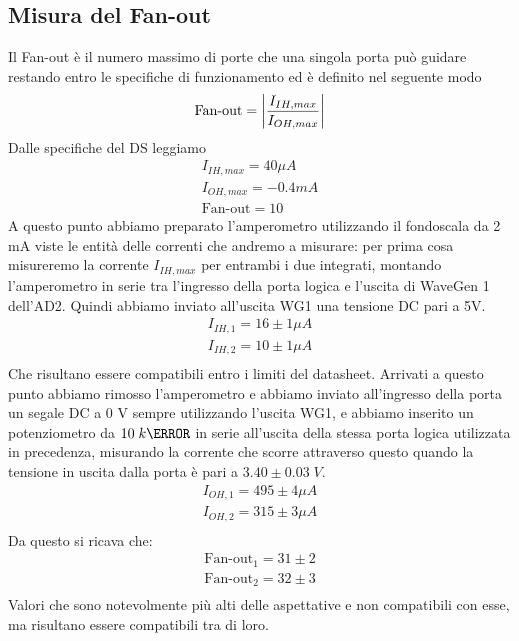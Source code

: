 \documentclass[10pt, a4paper, italian]{article}
\begin{document}
\subsection{Misura del Fan-out}
Il Fan-out è il numero massimo di porte che una singola porta può guidare restando entro le specifiche di funzionamento ed è definito nel seguente modo
\[
\mbox{Fan-out}=\left|   \frac{I_{IH,max}}{I_{OH,max}} \right|
\]
Dalle specifiche del DS leggiamo
\begin{gather*}
    I_{IH,max}=40 \mu A\\
    I_{OH,max}= -0.4 m A\\
    \mbox{Fan-out}=10
\end{gather*}
A questo punto abbiamo preparato l'amperometro utilizzando il fondoscala da 2 mA viste le entità delle correnti che andremo a misurare: per prima cosa misureremo la corrente $I_{IH,max}$ per entrambi i due integrati, montando l'amperometro in serie tra l'ingresso della porta logica e l'uscita di WaveGen 1 dell'AD2. Quindi abbiamo inviato all'uscita WG1 una tensione DC pari a 5V.
\begin{gather*}
    I_{IH,1}=16 \pm 1 \mu A\\
    I_{IH,2}=10 \pm 1 \mu A\\   
\end{gather*}
Che risultano essere compatibili entro i limiti del datasheet.
Arrivati a questo punto abbiamo rimosso l'amperometro e abbiamo inviato all'ingresso della porta un segale DC a 0 V sempre utilizzando l'uscita WG1, e abbiamo inserito un potenziometro da $10 \; k\ohm$ in serie all'uscita della stessa porta logica utilizzata in precedenza, misurando la corrente che scorre attraverso questo quando la tensione in uscita dalla porta è pari a $3.40 \pm 0.03 \; V$.
\begin{gather*}
    I_{OH,1}=495 \pm 4 \mu A\\
    I_{OH,2}=315 \pm 3 \mu A\\   
\end{gather*}
Da questo si ricava che:
\begin{gather*}
    \mbox{Fan-out}_1=31 \pm 2\\
    \mbox{Fan-out}_2=32 \pm 3\\
\end{gather*}
Valori che sono notevolmente più alti delle aspettative e non compatibili con esse, ma risultano essere compatibili tra di loro.
\end{document}

